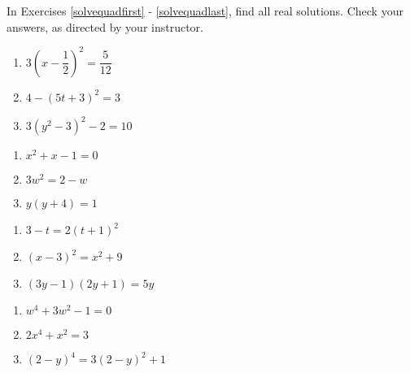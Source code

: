 \documentclass[10pt]{article}
\begin{document}
In Exercises \ref{solvequadfirst} - \ref{solvequadlast}, find all real solutions.  Check your answers, as directed by your instructor.

\begin{multicols}{3}
\begin{enumerate}

\item  $3\left(x - \dfrac{1}{2}\right)^2 = \dfrac{5}{12}$ \label{solvequadfirst}
\item  $4 - (5t+3)^2 = 3$ 
\item  $3(y^2-3)^2-2 = 10$ 

\setcounter{HW}{\value{enumi}}
\end{enumerate}
\end{multicols}

\begin{multicols}{3}
\begin{enumerate}
\setcounter{enumi}{\value{HW}}

\item $x^2 + x - 1 = 0$
\item $3w^2 = 2-w$
\item $y(y+4) = 1$

\setcounter{HW}{\value{enumi}}
\end{enumerate}
\end{multicols}


\begin{multicols}{3}
\begin{enumerate}
\setcounter{enumi}{\value{HW}}

\item $3-t = 2(t+1)^2$
\item $(x-3)^2 = x^2+9$
\item $(3y-1)(2y+1) = 5y$

\setcounter{HW}{\value{enumi}}
\end{enumerate}
\end{multicols}

\begin{multicols}{3}
\begin{enumerate}
\setcounter{enumi}{\value{HW}}

\item $w^4 + 3w^2 - 1 = 0$
\item $2x^4 +x^2 = 3$ 
\item $(2-y)^4 = 3(2-y)^2 + 1$

\setcounter{HW}{\value{enumi}}
\end{enumerate}
\end{multicols}
\end{document}
